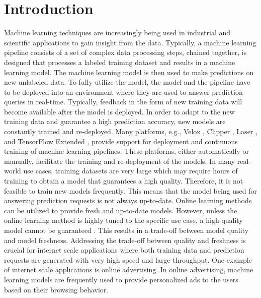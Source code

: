 \section{Introduction} \label{introduction}
Machine learning techniques are increasingly being used in industrial and scientific applications to gain insight from the data.
Typically, a machine learning pipeline consists of a set of complex data processing steps, chained together, is designed that processes a labeled training dataset and results in a machine learning model.
The machine learning model is then used to make predictions on new unlabeled data.
To fully utilize the model,  the model and the pipeline have to be deployed into an environment where they are used to answer prediction queries in real-time.
Typically, feedback in the form of new training data will become available after the model is deployed.
In order to adapt to the new training data and guarantee a high prediction accuracy, new models are constantly trained and re-deployed.
Many platforms, e.g., Velox \cite{crankshaw2014missing}, Clipper \cite{crankshaw2016clipper}, Laser \cite{agarwal2014laser}, and TensorFlow Extended \cite{baylor2017tfx}, provide support for deployment and continuous training of machine learning pipelines. 
These platforms, either automatically or manually, facilitate the training and re-deployment of the models.
In many real-world use cases, training datasets are very large which may require hours of training to obtain a model that guarantees a high quality.
Therefore, it is not feasible to train new models frequently.
This means that the model being used for answering prediction requests is not always up-to-date.
Online learning methods can be utilized to provide fresh and up-to-date models.
However, unless the online learning method is highly tuned to the specific use case, a high-quality model cannot be guaranteed \cite{ma2009identifying}. 
This results in a trade-off between model quality and model freshness.
Addressing the trade-off between quality and freshness is crucial for internet scale applications where both training data and prediction requests are generated with very high speed and large throughput.
One example of internet scale applications is online advertising.
In online advertising, machine learning models are frequently used to provide personalized ads to the users based on their browsing behavior.
